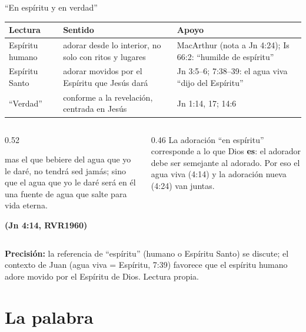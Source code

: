 \documentclass[hyperref={bookmarks=false},aspectratio=169]{beamer}
\newcommand{\fuente}[1]{\par\hfill{\upshape\bfseries\footnotesize\textcolor{azul}{#1}}}
\newcommand{\destacar}[1]{\textbf{\textcolor{azul}{#1}}}
\newcommand{\precision}[1]{{\footnotesize\color{gris}\textbf{Precisión:} #1}}
\begin{document}
\begin{frame}{``En espíritu y en verdad''}
\scriptsize\renewcommand{\arraystretch}{1.2}
\begin{tabular}{@{}>{\RaggedRight\arraybackslash}p{2.6cm}>{\RaggedRight\arraybackslash}p{4.6cm}>{\RaggedRight\arraybackslash}p{4.6cm}@{}}
\toprule
\textbf{Lectura} & \textbf{Sentido} & \textbf{Apoyo} \\ \midrule
Espíritu humano & adorar desde lo interior, no solo con ritos y lugares & MacArthur (nota a Jn 4:24); Is 66:2: ``humilde de espíritu'' \\
Espíritu Santo & adorar movidos por el Espíritu que Jesús dará & Jn 3:5--6; 7:38--39: el agua viva ``dijo del Espíritu'' \\
``Verdad'' & conforme a la revelación, centrada en Jesús & Jn 1:14, 17; 14:6 \\
\bottomrule
\end{tabular}\par\medskip
\begin{columns}[t,onlytextwidth]
\begin{column}{0.52\textwidth}
\begin{cita}mas el que bebiere del agua que yo le daré, no tendrá sed jamás; sino que el agua que yo le daré será en él una fuente de agua que salte para vida eterna.\fuente{(Jn 4:14, RVR1960)}\end{cita}
\end{column}
\begin{column}{0.46\textwidth}\small
La adoración ``en espíritu'' corresponde a lo que Dios \destacar{es}: el adorador debe ser semejante al adorado. Por eso el agua viva (4:14) y la adoración nueva (4:24) van juntas.
\end{column}
\end{columns}
\precision{la referencia de ``espíritu'' (humano o Espíritu Santo) se discute; el contexto de Juan (agua viva = Espíritu, 7:39) favorece que el espíritu humano adore movido por el Espíritu de Dios. Lectura propia.}
\end{frame}

\section{La palabra}
\end{document}

